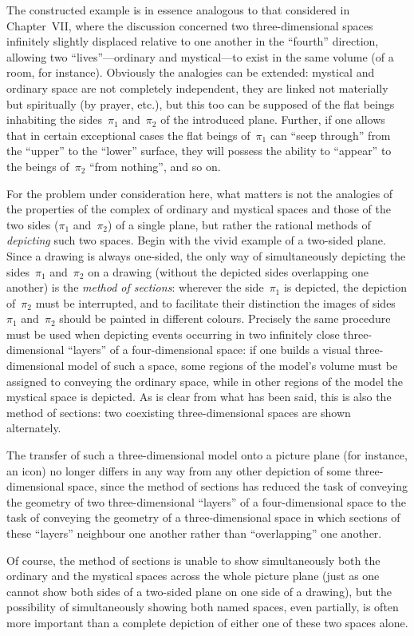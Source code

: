 
The constructed example is in essence analogous to that considered in Chapter~VII, where
the discussion concerned two three-dimensional spaces infinitely slightly displaced
relative to one another in the ``fourth'' direction, allowing two ``lives''---ordinary
and mystical---to exist in the same volume (of a room, for instance).  Obviously the
analogies can be extended: mystical and ordinary space are not completely independent,
they are linked not materially but spiritually (by prayer, etc.), but this too can be
supposed of the flat beings inhabiting the sides~$\pi_1$ and~$\pi_2$ of the introduced
plane.  Further, if one allows that in certain exceptional cases the flat beings of~$\pi_1$
can ``seep through'' from the ``upper'' to the ``lower'' surface, they will possess the
ability to ``appear'' to the beings of~$\pi_2$ ``from nothing'', and so on.

For the problem under consideration here, what matters is not the analogies of the
properties of the complex of ordinary and mystical spaces and those of the two sides
($\pi_1$ and~$\pi_2$) of a single plane, but rather the rational methods of \emph{depicting}
such two spaces.  Begin with the vivid example of a two-sided plane.  Since a drawing
is always one-sided, the only way of simultaneously depicting the sides~$\pi_1$ and~$\pi_2$
on a drawing (without the depicted sides overlapping one another) is the \emph{method of
sections}: wherever the side~$\pi_1$ is depicted, the depiction of~$\pi_2$ must be
interrupted, and to facilitate their distinction the images of sides~$\pi_1$ and~$\pi_2$
should be painted in different colours.  Precisely the same procedure must be used when
depicting events occurring in two infinitely close three-dimensional ``layers'' of a
four-dimensional space: if one builds a visual three-dimensional model of such a space,
some regions of the model's volume must be assigned to conveying the ordinary space,
while in other regions of the model the mystical space is depicted.  As is clear from
what has been said, this is also the method of sections: two coexisting three-dimensional
spaces are shown alternately.

The transfer of such a three-dimensional model onto a picture plane (for instance, an
icon) no longer differs in any way from any other depiction of some three-dimensional
space, since the method of sections has reduced the task of conveying the geometry of two
three-dimensional ``layers'' of a four-dimensional space to the task of conveying the
geometry of a three-dimensional space in which sections of these ``layers'' neighbour one
another rather than ``overlapping'' one another.


Of course, the method of sections is unable to show simultaneously both the ordinary and
the mystical spaces across the whole picture plane (just as one cannot show both sides of
a two-sided plane on one side of a drawing), but the possibility of simultaneously showing
both named spaces, even partially, is often more important than a complete depiction of
either one of these two spaces alone.
